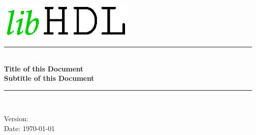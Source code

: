 
\begin{titlepage}

\begin{center}

\includegraphics[width = 0.5\textwidth]{images/libhdl_logo_1}
\\[0.2cm]

\rule{\linewidth}{0.5mm}\\[0.5cm]
{\huge \bfseries Title of this Document}\\[0.5cm]
{\Large \bfseries Subtitle of this Document}\\[0.5cm]
\rule{\linewidth}{0.7mm}
\\[1.5cm]

\vfill

Version: \version\\[0.5cm]
Date: \today\\[0.5cm]

\end{center}

\end{titlepage}
